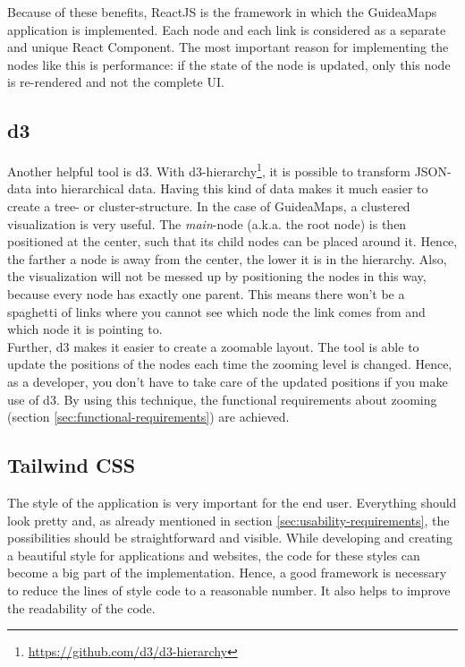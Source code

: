 Because of these benefits, ReactJS is the framework in which the GuideaMaps application is implemented. Each node and each link is considered as a separate and unique React Component. The most important reason for implementing the nodes like this is performance: if the state of the node is updated, only this node is re-rendered and not the complete UI.

\subsection{d3}\label{sec:d3}
Another helpful tool is d3. With d3-hierarchy\footnote{\url{https://github.com/d3/d3-hierarchy}}, it is possible to transform JSON-data into hierarchical data. Having this kind of data makes it much easier to create a tree- or cluster-structure. In the case of GuideaMaps, a clustered visualization is very useful. The \textit{main}-node (a.k.a. the root node) is then positioned at the center, such that its child nodes can be placed around it. Hence, the farther a node is away from the center, the lower it is in the hierarchy. Also, the visualization will not be messed up by positioning the nodes in this way, because every node has exactly one parent. This means there won't be a spaghetti of links where you cannot see which node the link comes from and which node it is pointing to.\\

Further, d3 makes it easier to create a zoomable layout. The tool is able to update the positions of the nodes each time the zooming level is changed. Hence, as a developer, you don't have to take care of the updated positions if you make use of d3. By using this technique, the functional requirements about zooming (section \ref{sec:functional-requirements}) are achieved.

\subsection{Tailwind CSS}\label{sec:tailwind}
The style of the application is very important for the end user. Everything should look pretty and, as already mentioned in section \ref{sec:usability-requirements}, the possibilities should be straightforward and visible. While developing and creating a beautiful style for applications and websites, the code for these styles can become a big part of the implementation. Hence, a good framework is necessary to reduce the lines of style code to a reasonable number. It also helps to improve the readability of the code.\\

